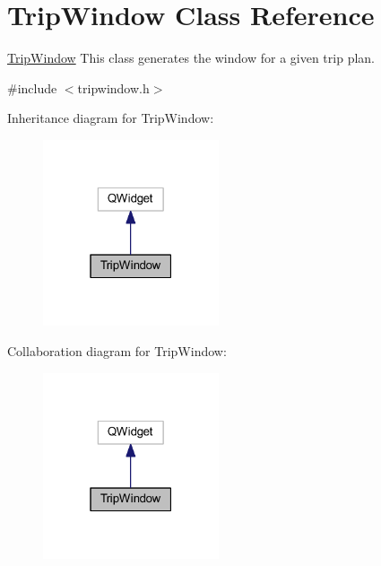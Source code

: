 \hypertarget{class_trip_window}{}\section{Trip\+Window Class Reference}
\label{class_trip_window}


\mbox{\hyperlink{class_trip_window}{Trip\+Window}} This class generates the window for a given trip plan.  




{\ttfamily \#include $<$tripwindow.\+h$>$}



Inheritance diagram for Trip\+Window\+:\nopagebreak
\begin{figure}[H]
\begin{center}
\leavevmode
\includegraphics[width=147pt]{class_trip_window__inherit__graph}
\end{center}
\end{figure}


Collaboration diagram for Trip\+Window\+:\nopagebreak
\begin{figure}[H]
\begin{center}
\leavevmode
\includegraphics[width=147pt]{class_trip_window__coll__graph}
\end{center}
\end{figure}
